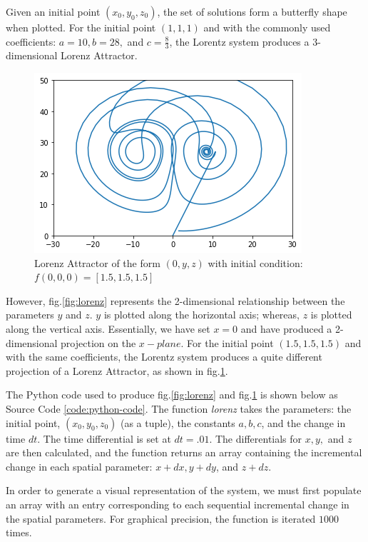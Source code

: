 \documentclass{article}
\begin{document}
Given an initial point $(x_0,y_0,z_0)$, the set of solutions form a butterfly shape when plotted.  For the initial point $(1,1,1)$ and with the commonly used coefficients\cite{tabor1989chaos}: $ a=10, b=28,$ and $c=\frac{8}{3}$, the Lorentz system produces a 3-dimensional Lorenz Attractor.  

\begin{figure}[h!]
\centering
\includegraphics[width=.75\textwidth]{lorenz_Attractor2}
\caption{Lorenz Attractor of the form $(0,y,z)$ with initial condition: $f(0,0,0)=[1.5,1.5,1.5]$}
\label{fig:lorenz2}
\end{figure}

However, fig.\ref{fig:lorenz} represents the 2-dimensional relationship between the parameters $y$ and $z$.  $y$ is plotted along the horizontal axis; whereas, $z$ is plotted along the vertical axis.  Essentially, we have set $x=0$ and have produced a 2-dimensional projection on the $x-plane$.  For the initial point $(1.5,1.5,1.5)$ and with the same coefficients, the Lorentz system produces a quite different projection of a Lorenz Attractor, as shown in fig.\ref{fig:lorenz2}.

The Python code used to produce fig.\ref{fig:lorenz} and fig.\ref{fig:lorenz2} is shown below as Source Code \ref{code:python-code}.  The function \emph{lorenz} takes the parameters: the initial point, $(x_0,y_0,z_0)$ (as a tuple), the constants $a, b, c$, and the change in time $dt$.  The time differential is set at $dt=.01$.  The differentials for $x, y,$ and $z$ are then calculated, and the function returns an array containing the incremental change in each spatial parameter: $x+dx, y+dy$, and $z+dz$.   

In order to generate a visual representation of the system, we must first populate an array with an entry corresponding to each sequential incremental change in the spatial parameters.  For graphical precision, the function is iterated $1000$ times.
\end{document}

